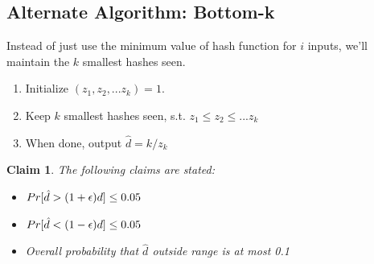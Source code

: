 \documentclass[11pt]{article}
\newtheorem{claim}[theorem]{Claim}
\def\eps{\ensuremath\epsilon}
\begin{document}
\subsection{Alternate Algorithm: Bottom-k}
Instead of just use the minimum value of hash function for $i$ inputs, we'll maintain the $k$ smallest hashes seen.
\begin{enumerate}
\item Initialize $(z_{1}, z_{2},...z_{k}) = 1$.
\item Keep $k$ smallest hashes seen, s.t. $z_{1}\leq z_{2}\leq...z_{k}$
\item When done, output $\hat{d} = k/z_{k}$
\end{enumerate}

\begin{claim}
The following claims are stated:
\begin{itemize}
\item $Pr[\hat{d} > (1 + \eps)d] \leq 0.05$
\item $Pr[\hat{d} < (1 - \eps)d] \leq 0.05$
\item Overall probability that $\hat{d}$ outside range is at most 0.1
\end{itemize}
\end{claim}
\end{document}
